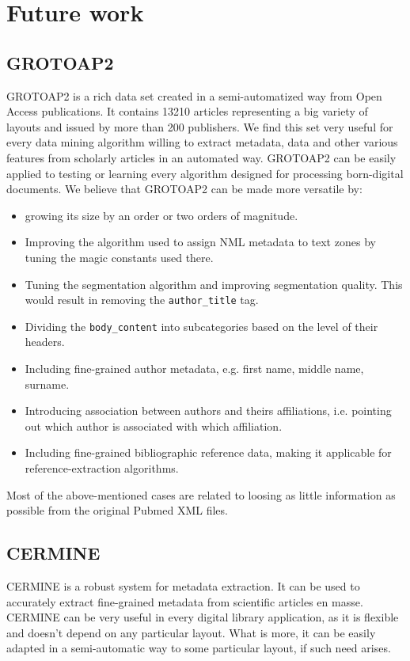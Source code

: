 \section{Future work}
\subsection{GROTOAP2}
GROTOAP2 is a rich data set created in a semi-automatized way from Open Access publications. It contains 13210 articles representing a big variety of layouts and issued by more than 200 publishers. We find this set very useful for every data mining algorithm willing to extract metadata, data and other various features from scholarly articles in an automated way. GROTOAP2 can be easily applied to testing or learning every algorithm designed for processing born-digital documents.
\quad
We believe that GROTOAP2 can be made more versatile by:
\begin{itemize}
\item growing its size by an order or two orders of magnitude.
\item Improving the algorithm used to assign NML metadata to text zones by tuning the magic constants used there.
\item Tuning the segmentation algorithm and improving segmentation quality. This would result in removing the \verb+author_title+ tag.
\item Dividing the \verb+body_content+ into subcategories based on the level of their headers.
\item Including fine-grained author metadata, e.g. first name, middle name, surname.
\item Introducing association between authors and theirs affiliations, i.e. pointing out which author is associated with which affiliation.
\item Including fine-grained bibliographic reference data, making it applicable for reference-extraction algorithms.
\end{itemize}
Most of the above-mentioned cases are related to loosing as little information as possible from the original Pubmed XML files.

\subsection{CERMINE}
CERMINE is a robust system for metadata extraction. It can be used to accurately extract fine-grained metadata from scientific articles en masse. CERMINE can be very useful in every digital library application, as it is flexible and doesn't depend on any particular layout. What is more, it can be easily adapted in a semi-automatic way to some particular layout, if such need arises.


